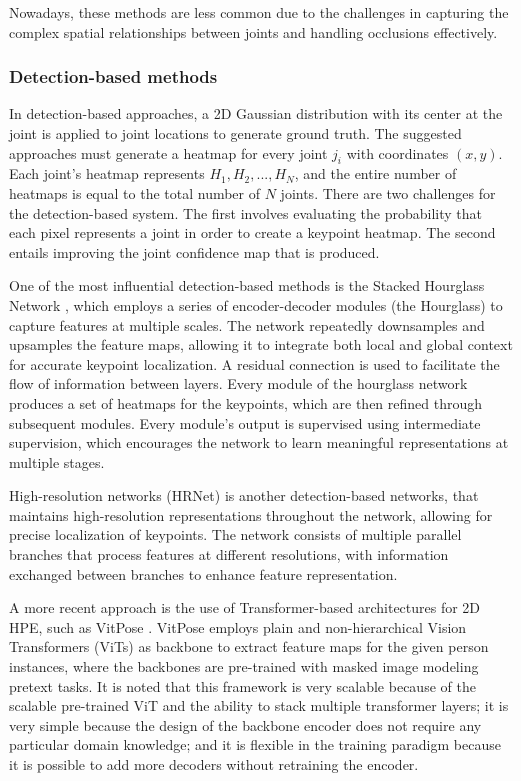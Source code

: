 Nowadays, these methods are less common due to the challenges in capturing the complex spatial relationships between joints and handling occlusions effectively.


\subsubsection{Detection-based methods}
In detection-based approaches, a 2D Gaussian distribution with its center at the joint is applied to joint locations to generate ground truth.  The suggested approaches must generate a heatmap for every 
joint $j_i$ with coordinates \((x, y)\).  Each joint's heatmap represents {$H_1, H_2,..., H_N$}, and the entire number of heatmaps is equal to the total number of $N$ joints.
There are two challenges for the detection-based system. The first involves evaluating the probability that each pixel represents a joint in order to create a keypoint heatmap. The second entails improving 
the joint confidence map that is produced.

One of the most influential detection-based methods is the Stacked Hourglass Network \cite{newell2016stacked}, which employs a series of encoder-decoder modules (the Hourglass) to capture features at multiple scales. The network
repeatedly downsamples and upsamples the feature maps, allowing it to integrate both local and global context for accurate keypoint localization. A residual connection is used to facilitate the flow of information between layers.
Every module of the hourglass network produces a set of heatmaps for the keypoints, which are then refined through subsequent modules. Every module's output is supervised using intermediate supervision, which encourages the network 
to learn meaningful representations at multiple stages.

High-resolution networks (HRNet) \cite{sun2019deep} is another detection-based networks, that maintains high-resolution representations throughout the network, allowing for precise localization of keypoints. The network consists of multiple parallel branches that process features 
at different resolutions, with information exchanged between branches to enhance feature representation.

A more recent approach is the use of Transformer-based architectures for 2D HPE, such as VitPose \cite{xu2022vitpose}. VitPose employs plain and non-hierarchical Vision Transformers (ViTs) \cite{dosovitskiy2020image} as backbone to extract feature maps for the given person instances, where the backbones are
pre-trained with masked image modeling pretext tasks. It is noted that this framework is very scalable because of the scalable pre-trained ViT and the ability to stack multiple transformer layers; it is very simple because the design of the backbone encoder does not require any particular domain knowledge; 
and it is flexible in the training paradigm because it is possible to add more decoders without retraining the encoder.


